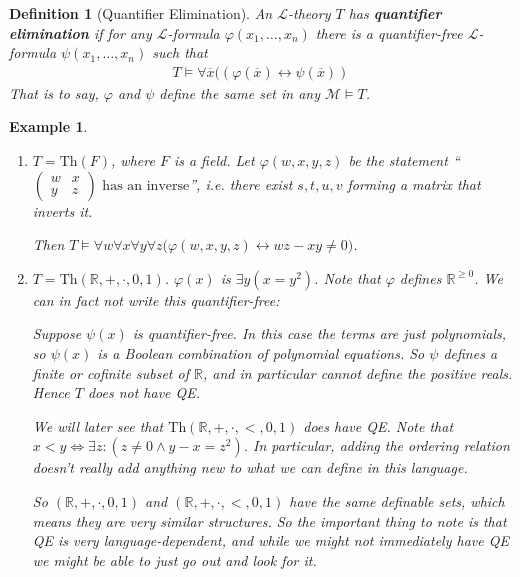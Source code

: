 \documentclass[]{article}
\theoremstyle{custhm}
\theoremstyle{cusdef}
\newtheorem{defin}[theorem]{Definition}
\theoremstyle{custhm}
\theoremstyle{custhm}
\theoremstyle{custhm}
\theoremstyle{ex}
\newtheorem{ex}[theorem]{Example}
\theoremstyle{custhm}
\theoremstyle{cusdef}
\theoremstyle{remark}
\theoremstyle{remark}
\newcommand{\R}{\mathbb{R}}
\newcommand{\undf}[1]{\textit{\textbf{#1}}}
\renewcommand{\L}{\mathcal{L}}
\renewcommand{\it}[1]{\textit{#1}}
\newcommand{\M}{\mathcal{M}}
\renewcommand{\phi}{\varphi}
\renewcommand{\bar}{\overline}
\newcommand{\Th}{\textrm{Th}}
\begin{document}
\begin{defin}[Quantifier Elimination]
An $\L$-theory $T$ has \undf{quantifier elimination} if for any $\L$-formula $\phi(x_1,\dots,x_n)$ there is a quantifier-free $\L$-formula $\psi(x_1,\dots,x_n)$ such that
\begin{align*}
T\models \forall \bar{x}\big((\phi(\bar{x})\leftrightarrow \psi(\bar{x}))
\end{align*}
That is to say, $\phi$ and $\psi$ define the same set in any $\M\models T$.
\end{defin}

\begin{ex}\ 
\begin{enumerate}[label=(\arabic*)]
\item $T = \Th(F)$, where $F$ is a field. Let $\phi(w,x,y,z)$ be the statement ``$\left(\begin{array}{cc} w & x\\ y & z\end{array}\right)\textrm{ has an inverse}$'', {\it i.e.} there exist $s,t,u,v$ forming a matrix that inverts it.

Then $T\models \forall w\forall x\forall y\forall z\big(\phi(w,x,y,z)\leftrightarrow wz-xy\ne 0\big)$.


\item $T = \Th(\R,+,\cdot,0,1)$. $\phi(x)$ is $\exists y(x = y^2)$. Note that $\phi$ defines $\R^{\ge 0}$. We can in fact not write this quantifier-free:

Suppose $\psi(x)$ is quantifier-free. In this case the terms are just polynomials, so $\psi(x)$ is a Boolean combination of polynomial equations. So $\psi$ defines a finite or cofinite subset of $\R$, and in particular cannot define the positive reals. Hence $T$ does not have QE.

We will later see that $\Th(\R,+,\cdot,<,0,1)$ {\it does} have QE. Note that $x < y \iff \exists z: (z\ne 0 \land y-x = z^2)$. In particular, adding the ordering relation doesn't really add anything new to what we can define in this language.

So $(\R,+,\cdot,0,1)$ and $(\R,+,\cdot,<,0,1)$ have the same definable sets, which means they are very similar structures. So the important thing to note is that QE is very language-dependent, and while we might not immediately have QE we might be able to just go out and look for it.
\end{enumerate}
\end{ex}
\end{document}
